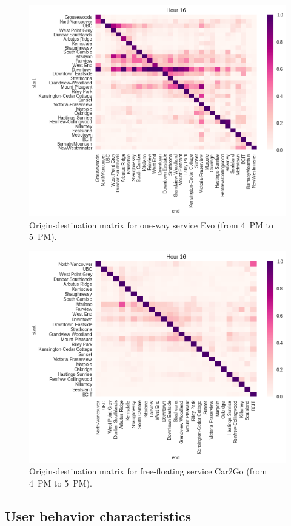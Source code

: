 \begin{figure}[tbh]
\centering
\includegraphics[width=0.85\columnwidth]{destination_matrix/hour16.png}
\caption{Origin-destination matrix for one-way service Evo (from 4~PM to 5~PM).}
\label{fig:matrixEvo}
\end{figure}
%
\begin{figure}[tbh]
\centering
\includegraphics[width=0.85\columnwidth]{car2go_destination_matrix/hour16.png}
\caption{Origin-destination matrix for free-floating service Car2Go (from 4~PM to 5~PM).}
\label{fig:matrixCar2Go}
\end{figure}




\subsection{User behavior characteristics}
\label{sec:user-behavior}


